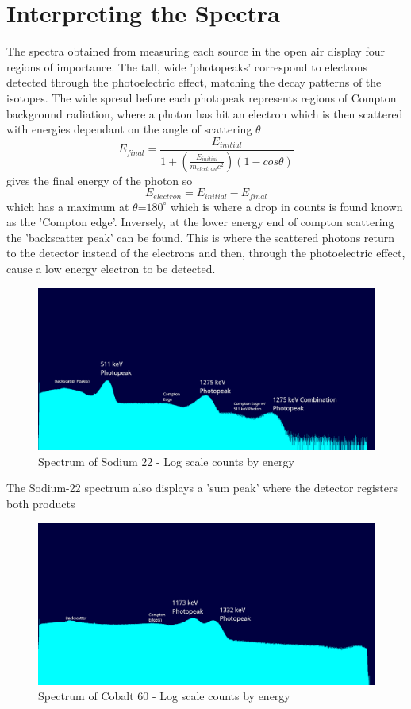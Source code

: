 \documentclass[12pt, a4paper]{article}
\begin{document}
\section{Interpreting the Spectra}
The spectra obtained from measuring each source in the open air display four regions of importance. The tall, wide 'photopeaks' correspond to electrons detected through the photoelectric effect, matching the decay patterns of the isotopes. The wide spread before each photopeak represents regions of Compton background radiation, where a photon has hit an electron which is then scattered with energies dependant on the angle of scattering $\theta$
	\begin{equation}
		E_{final} = \frac{E_{initial}}{1+(\frac{E_{initial}}{m_{electron}c^{2}})(1-cos\theta)}
	\end{equation}
gives the final energy of the photon so
	\begin{equation}
	E_{electron} = E_{initial}-E_{final}
	\end{equation}
which has a maximum at $\theta$=$180^{\circ}$ which is where a drop in counts is found known as the 'Compton edge'. Inversely, at the lower energy end of compton scattering the 'backscatter peak' can be found. This is where the scattered photons return to the detector instead of the electrons and then, through the photoelectric effect, cause a low energy electron to be detected.
\begin{figure}[H] \centering
		\includegraphics[scale=0.3]{assets/na22_log_annotated.png}
		\caption{Spectrum of Sodium 22 - Log scale counts by energy}
	\end{figure}
The Sodium-22 spectrum also displays a 'sum peak' where the detector registers both products
	\begin{figure}[H] \centering
		\includegraphics[scale=0.3]{assets/co60_log_annotated.png}
		\caption{Spectrum of Cobalt 60 - Log scale counts by energy}
	\end{figure}
\end{document}
